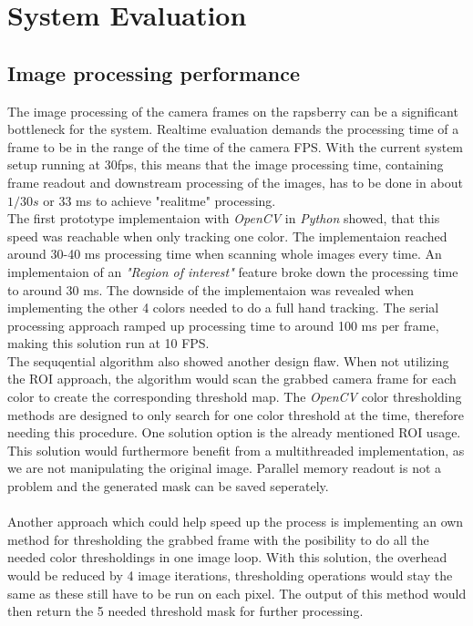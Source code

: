 \chapter{System Evaluation}
\section{Image processing performance}
The image  processing of the camera frames on the rapsberry can be a significant bottleneck for the system. Realtime evaluation demands the processing time of a frame to be in the range of the time of the camera FPS. With the current system setup running at 30fps, this means that the image processing time, containing frame readout and downstream processing of the images, has to be done in about $1/30s$ or 33 ms to achieve "realitme" processing.\\ 
The first prototype implementaion with \textit{OpenCV} in \textit{Python} showed, that this speed was reachable when only tracking one color. The implementaion reached around 30-40 ms processing time when scanning whole images every time. An implementaion of an \textit{"Region of interest"} feature broke down the processing time to around 30 ms. The downside of the implementaion was revealed when implementing the other 4 colors needed to do a full hand tracking. The serial processing approach ramped up processing time to around 100 ms per frame, making this solution run at 10 FPS.\\ 
The sequqential algorithm also showed another design flaw. When not utilizing the ROI approach, the algorithm would scan the grabbed camera frame for each color to create the corresponding threshold map. The \textit{OpenCV} color thresholding methods are designed to only search for one color threshold at the time, therefore needing this procedure. One solution option is the already mentioned ROI usage. This solution would furthermore benefit from a multithreaded implementation, as we are not manipulating the original image. Parallel memory readout is not a problem and the generated mask can be saved seperately.\\
\\
Another approach which could help speed up the process is implementing an own method for thresholding the grabbed frame with the posibility to do all the needed color thresholdings in one image loop. With this solution, the overhead would be reduced by 4 image iterations, thresholding operations would stay the same as these still have to be run on each pixel. The output of this method would then return the 5 needed threshold mask for further processing.\\
